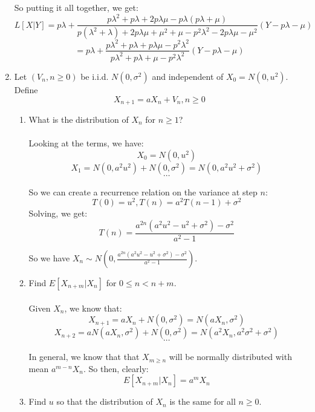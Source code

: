 \begin{enumerate}
    So putting it all together, we get:
    $$L[X|Y] = p \lambda + \frac{p \lambda^2 + p \lambda + 2p \lambda \mu - p \lambda(p \lambda + \mu)}{p(\lambda^2 + \lambda) + 2p \lambda \mu + \mu^2 + \mu - p^2 \lambda^2 - 2 p \lambda \mu - \mu^2}(Y - p \lambda - \mu)$$
    $$=p \lambda + \frac{p \lambda^2 + p \lambda + p \lambda \mu - p^2 \lambda^2}{p \lambda^2 + p \lambda + \mu - p^2 \lambda^2}(Y - p \lambda - \mu)$$

  \item Let $(V_n, n \geq 0)$ be i.i.d. $N(0, \sigma^2)$ and independent of $X_0 = N(0,u^2)$. Define
    $$X_{n+1} = aX_n + V_n, n \geq 0$$
    \begin{enumerate}
      \item What is the distribution of $X_n$ for $n \geq 1$?\\\\

        Looking at the terms, we have:
        $$X_0 = N(0, u^2)$$
        $$X_1 = N(0, a^2u^2) + N(0, \sigma^2) = N(0, a^2u^2 + \sigma^2)$$
        $$\cdots$$

        So we can create a recurrence relation on the variance at step $n$:
        $$T(0) = u^2, T(n) = a^2 T(n-1) + \sigma^2$$
        Solving, we get:
        $$T(n) = \frac{a^{2n}(a^2u^2 - u^2 + \sigma^2) - \sigma^2}{a^2 - 1}$$

        So we have $X_n \sim N(0, \frac{a^{2n}(a^2u^2 - u^2 + \sigma^2) - \sigma^2}{a^2 - 1})$.

      \item Find $E[X_{n+m} | X_n]$ for $0 \leq n < n + m$.\\\\

        Given $X_n$, we know that:
        $$X_{n+1} = aX_n + N(0,\sigma^2) = N(aX_n,\sigma^2)$$
        $$X_{n+2} = aN(aX_n, \sigma^2) + N(0, \sigma^2) = N(a^2X_n, a^2 \sigma^2 + \sigma^2)$$
        $$\cdots$$

        In general, we know that that $X_{m \geq n}$ will be normally distributed with mean $a^{m-n} X_n$. So then, clearly:
        $$E[X_{n+m} | X_n] = a^m X_n$$

      \item Find $u$ so that the distribution of $X_n$ is the same for all $n \geq 0$.\\\\


\end{enumerate}
\end{enumerate}
